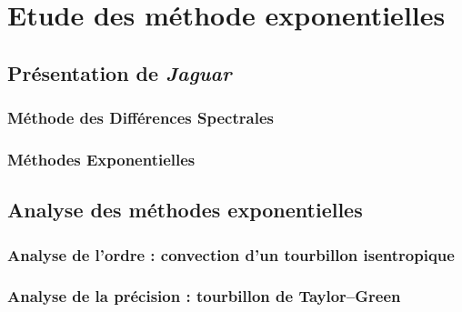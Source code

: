 \chapter{Etude des méthode exponentielles}
  \section{Présentation de \emph{Jaguar}}
    \subsection{Méthode des Différences Spectrales}
    \subsection{Méthodes Exponentielles}
  \section{Analyse des méthodes exponentielles}
    \subsection{Analyse de l'ordre : convection d'un tourbillon isentropique}
    \subsection{Analyse de la précision : tourbillon de Taylor--Green}








\pagebreak




